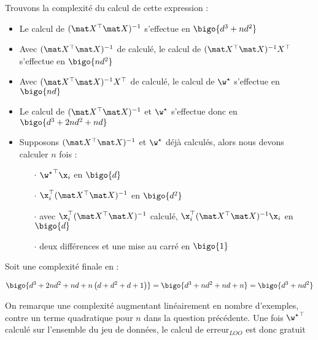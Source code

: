 \begin{enumerate}[resume]
\begin{reponse}
		      Trouvons la complexité du calcul de cette expression :

		      \begin{itemize}
			      \item Le calcul de $(\X^\top\X)^{-1}$ s'effectue en $\bigo{d^3 + nd^2}$
			      \item Avec $(\X^\top\X)^{-1}$ de calculé, le calcul de $(\X^\top\X)^{-1}X^\top$ s'effectue en $\bigo{nd^2}$
			      \item Avec $(\X^\top\X)^{-1}X^\top$ de calculé, le calcul de ${\w^{\star}}$ s'effectue en $\bigo{nd}$
			      \item Le calcul de $(\X^\top\X)^{-1}$ et ${\w^{\star}}$ s'effectue donc en $\bigo{d^3 + 2nd^2 + nd}$
			      \item Supposons $(\X^\top\X)^{-1}$ et ${\w^{\star}}$ déjà calculés, alors nous devons calculer $n$ fois :
			            \begin{itemize}
				            \item[$\cdot$] ${\w^{\star}}^\top\x_i$ en $\bigo{d}$
				            \item[$\cdot$] $\x_i^\top(\X^\top\X)^{-1}$ en $\bigo{d^2}$
				            \item[$\cdot$] avec $\x_i^\top(\X^\top\X)^{-1}$ calculé, $\x_i^\top(\X^\top\X)^{-1} \x_i$ en $\bigo{d}$
				            \item[$\cdot$] deux différences et une mise au carré en $\bigo{1}$
			            \end{itemize}
		      \end{itemize}

		      Soit une complexité finale en :

		      \begin{equation*}
			      \bigo{d^3 + 2nd^2 + nd + n\left(d + d^2 + d +1\right)}
			      = \bigo{d^3 + nd^2 + nd + n}
			      = \bigo{d^3 + nd^2}
		      \end{equation*}

		      On remarque une complexité augmentant linéairement en nombre d'exemples, contre un terme quadratique pour $n$ dans la question précédente.
		      Une fois ${\w^{\star}}^\top$ calculé sur l'ensemble du jeu de données, le calcul de $\mathrm{erreur}_{LOO}$ est donc gratuit
	      \end{reponse}
\end{enumerate}
